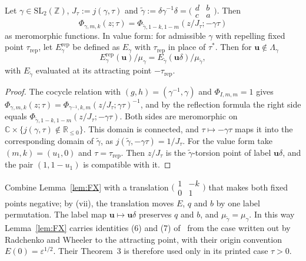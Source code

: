 \documentclass[11pt]{amsart}
\numberwithin{equation}{section}
\theoremstyle{plain}
\newenvironment{llemm}[1]{\renewcommand\thellemminner{#1}\llemminner}{\endllemminner}
\theoremstyle{definition}
\theoremstyle{remark}
\begin{document}
\begin{llemm}{FX}[Fixed-point exchange]\label{lem:FX}
Let \(\gamma\in\mathrm{SL}_2(\mathbb Z)\), \(J_\tau:=j(\gamma,\tau)\) and \(\tilde\gamma:=\delta\gamma^{-1}\delta=\bigl(\begin{smallmatrix}d&b\\c&a\end{smallmatrix}\bigr)\). Then
\[\Phi_{\gamma,m,k}(z;\tau)=\Phi_{\tilde\gamma,1-k,1-m}(z/J_\tau;-\gamma\tau)\]
as meromorphic functions. In value form: for admissible \(\gamma\) with repelling fixed point \(\tau_{\mathrm{rep}}\), let \(E^{\mathrm{rep}}_\gamma\) be defined as \(E_\gamma\) with \(\tau_{\mathrm{rep}}\) in place of \(\tau^*\). Then for \(\mathbf u\notin\Lambda_\gamma\)
\[E^{\mathrm{rep}}_\gamma(\mathbf u)/\mu_\gamma=E_{\tilde\gamma}(\mathbf u\delta)/\mu_{\tilde\gamma},\]
with \(E_{\tilde\gamma}\) evaluated at its attracting point \(-\tau_{\mathrm{rep}}\).
\end{llemm}

\begin{proof}
The cocycle relation with \((g,h)=(\gamma^{-1},\gamma)\) and \(\Phi_{I,m,m}=1\) gives \(\Phi_{\gamma,m,k}(z;\tau)=\Phi_{\gamma^{-1},k,m}(z/J_\tau;\gamma\tau)^{-1}\), and by the reflection formula the right side equals \(\Phi_{\tilde\gamma,1-k,1-m}(z/J_\tau;-\gamma\tau)\). Both sides are meromorphic on \(\mathbb C\times\{j(\gamma,\tau)\notin\mathbb R_{\le0}\}\). This domain is connected, and \(\tau\mapsto-\gamma\tau\) maps it into the corresponding domain of \(\tilde\gamma\), as \(j(\tilde\gamma,-\gamma\tau)=1/J_\tau\). For the value form take \((m,k)=(u_1,0)\) and \(\tau=\tau_{\mathrm{rep}}\). Then \(z/J_\tau\) is the \(\tilde\gamma\)-torsion point of label \(\mathbf u\delta\), and the pair \((1,1-u_1)\) is compatible with it.
\end{proof}

Combine Lemma~\ref{lem:FX} with a translation \(\bigl(\begin{smallmatrix}1&-k\\0&1\end{smallmatrix}\bigr)\) that makes both fixed points negative; by (vii), the translation moves \(E\), \(q\) and \(b\) by one label permutation. The label map \(\mathbf u\mapsto\mathbf u\delta\) preserves \(q\) and \(b\), and \(\mu_{\tilde\gamma}=\mu_\gamma\). In this way Lemma~\ref{lem:FX} carries identities (6) and (7) of~\cite{RW} from the case written out by Radchenko and Wheeler to the attracting point, with their origin convention \(E(0)=\varepsilon^{1/2}\). Their Theorem~3 is therefore used only in its printed case \(\tau>0\).
\end{document}
